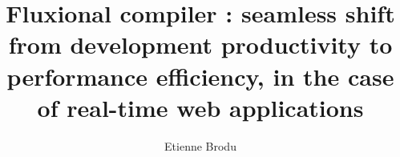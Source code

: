 \documentclass[12pt]{report}
\begin{document}

\title{Fluxional compiler : seamless shift from development productivity to performance efficiency, in the case of real-time web applications}

\author{Etienne Brodu}

\maketitle




\dominitoc %
\tableofcontents

\listoffigures
\listoftables








\printbibliography[]
\end{document}
